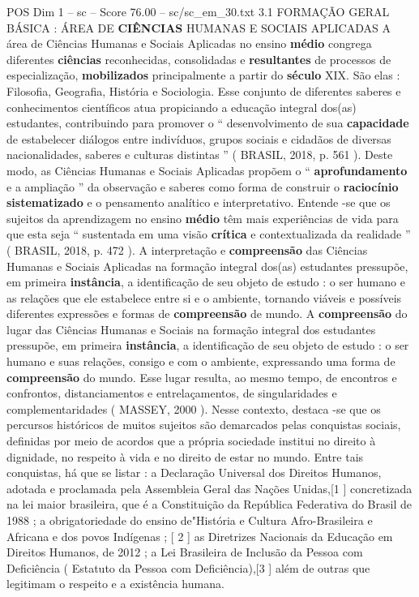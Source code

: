\begin{textsample}{POS Dim 1 – sc – Score 76.00 – sc/sc\_em\_30.txt}  \label{ex:f1_pos_007}
3.1 FORMAÇÃO GERAL BÁSICA : ÁREA DE \textbf{CIÊNCIAS} HUMANAS E SOCIAIS APLICADAS A área de Ciências Humanas e Sociais Aplicadas no ensino \textbf{médio} congrega diferentes \textbf{ciências} reconhecidas, consolidadas e \textbf{resultantes} de processos de especialização, \textbf{mobilizados} principalmente a partir do \textbf{século} XIX.
São elas : Filosofia, Geografia, História e Sociologia.
Esse conjunto de diferentes saberes e conhecimentos científicos atua propiciando a educação integral dos(as) estudantes, contribuindo para promover o “ desenvolvimento de sua \textbf{capacidade} de estabelecer diálogos entre indivíduos, grupos sociais e cidadãos de diversas nacionalidades, saberes e culturas distintas ” ( BRASIL, 2018, p. 561 ).
Deste modo, as Ciências Humanas e Sociais Aplicadas propõem o “ \textbf{aprofundamento} e a ampliação ” da observação e saberes como forma de construir o \textbf{raciocínio} \textbf{sistematizado} e o pensamento analítico e interpretativo.
Entende -se que os sujeitos da aprendizagem no ensino \textbf{médio} têm mais experiências de vida para que esta seja “ sustentada em uma visão \textbf{crítica} e contextualizada da realidade ” ( BRASIL, 2018, p. 472 ).
A interpretação e \textbf{compreensão} das Ciências Humanas e Sociais Aplicadas na formação integral dos(as) estudantes pressupõe, em primeira \textbf{instância}, a identificação de seu objeto de estudo : o ser humano e as relações que ele estabelece entre si e o ambiente, tornando viáveis e possíveis diferentes expressões e formas de \textbf{compreensão} de mundo.
A \textbf{compreensão} do lugar das Ciências Humanas e Sociais na formação integral dos estudantes pressupõe, em primeira \textbf{instância}, a identificação de seu objeto de estudo : o ser humano e suas relações, consigo e com o ambiente, expressando uma forma de \textbf{compreensão} do mundo.
Esse lugar resulta, ao mesmo tempo, de encontros e confrontos, distanciamentos e entrelaçamentos, de singularidades e complementaridades ( MASSEY, 2000 ).
Nesse contexto, destaca -se que os percursos históricos de muitos sujeitos são demarcados pelas conquistas sociais, definidas por meio de acordos que a própria sociedade institui no direito à dignidade, no respeito à vida e no direito de estar no mundo.
Entre tais conquistas, há que se listar : a Declaração Universal dos Direitos Humanos, adotada e proclamada pela Assembleia Geral das Nações Unidas,[1 ] concretizada na lei maior brasileira, que é a Constituição da República Federativa do Brasil de 1988 ; a obrigatoriedade do ensino de"História e Cultura Afro-Brasileira e Africana e dos povos Indígenas ; [ 2 ] as Diretrizes Nacionais da Educação em Direitos Humanos, de 2012 ; a Lei Brasileira de Inclusão da Pessoa com Deficiência ( Estatuto da Pessoa com Deficiência),[3 ] além de outras que legitimam o respeito e a existência humana.

\end{textsample}
